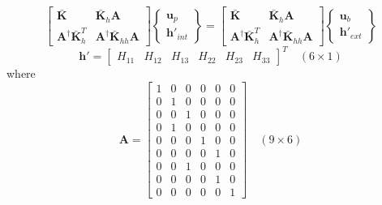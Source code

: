 \documentclass[11pt]{article} %
\begin{document}
\begin{equation}
	\left[ \begin{array}{cc} \bar{\mathbf{K}} & \bar{\mathbf{K}}_{h} \mathbf{A} \\ \mathbf{A}^{\dagger} \bar{\mathbf{K}}^T_{h} & \mathbf{A}^{\dagger} \bar{\mathbf{K}}_{hh} \mathbf{A} \end{array} \right] \left\{ \begin{array}{c} \mathbf{u}_p \\ \mathbf{h}'_{int} \end{array} \right\} = \left[ \begin{array}{cc} \bar{\mathbf{K}} & \bar{\mathbf{K}}_{h} \mathbf{A} \\ \mathbf{A}^{\dagger} \bar{\mathbf{K}}^T_{h} & \mathbf{A}^{\dagger} \bar{\mathbf{K}}_{hh} \mathbf{A} \end{array} \right] \left\{ \begin{array}{c} \mathbf{u}_b \\ \mathbf{h}'_{ext} \end{array} \right\}
\end{equation}
\begin{equation}
	\mathbf{h}' =  \left[ \begin{array}{cccccc} H_{11} & H_{12} & H_{13} & H_{22} & H_{23} & H_{33} \end{array} \right]^T \quad (6 \times 1)
\end{equation}
where
\begin{equation}
	\mathbf{A} =  \left[ \begin{array}{cccccc} 1 & 0 & 0 & 0 & 0 & 0 \\ 0 & 1 & 0 & 0 & 0 & 0 \\ 0 & 0 & 1 & 0 & 0 & 0 \\ 0 & 1 & 0 & 0 & 0 & 0 \\ 0 & 0 & 0 & 1 & 0 & 0 \\ 0 & 0 & 0 & 0 & 1 & 0 \\ 0 & 0 & 1 & 0 & 0 & 0 \\ 0 & 0 & 0 & 0 & 1 & 0 \\ 0 & 0 & 0 & 0 & 0 & 1 \end{array} \right] \quad (9 \times 6)
\end{equation}
\end{document}
